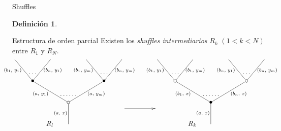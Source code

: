 \documentclass[12pt,aspectratio=169]{beamer}
\numberwithin{equation}{section}
\theoremstyle{definition}
\newtheorem{defi}[teo]{Definici\'on}
\begin{document}
{\begin{frame}{Shuffles}
\begin{defi}
    \end{defi}
\end{frame}

\begin{frame}{Estructura de orden parcial}
    Existen los \emph{shuffles intermediarios} $R_k$ $(1 < k < N)$ entre $R_1$ y $R_N$. %
    $$
        \xy
        <0.075cm, 0cm>:
        (0.0, 0.0)*{}="1"; %
        (0.0, 15.0)*\cir<2pt>{}="2"; %
        (-25.0, 30.0)*=0{\bullet}="3"; %
        (-37.5, 45.0)*{}="4"; %
        (-12.5, 45.0)*{}="5"; %
        (25.0, 30.0)*=0{\bullet}="6"; %
        (12.5, 45.0)*{}="7"; %
        (37.5, 45.0)*{}="8"; %
        "1";"2" **\dir{-};
        "2";"3" **\dir{-};
        "3";"4" **\dir{-};
        "3";"5" **\dir{-};
        "2";"6" **\dir{-};
        "6";"7" **\dir{-};
        "6";"8" **\dir{-};
        (-5.5, 7.5)*=0{\scriptstyle (a,\text{ }x)};
        (-19.5, 21)*=0{\scriptstyle (a,\text{ }y_1)};
        (-39, 37.5)*=0{\scriptstyle (b_1,\text{ }y_1)};
        (-11, 37.5)*=0{\scriptstyle (b_n,\text{ }y_1)};
        (19.5, 21)*=0{\scriptstyle (a,\text{ }y_m)};
        (10.5, 37.5)*=0{\scriptstyle (b_1,\text{ }y_m)};
        (39.5, 37.5)*=0{\scriptstyle (b_n,\text{ }y_m)};
        (-25,35)*{\dots};
        (25,35)*{\dots};
        (0,20)*{\dots\dots};
        (-13,0)*{R_l};
        \endxy
        \xy
        <0.08cm, 0cm>:
        (-10, 0.0)*{}="1";
        (10, 10.0)*{}="2";
        {\ar(-10, 10)*{};(10,10)*{}};
        \endxy
        \xy
        <0.075cm, 0cm>:
        (0.0, 0.0)*{}="1"; %
        (0.0, 15.0)*=0{\bullet}="2"; %
        (-25.0, 30.0)*\cir<2pt>{}="3"; %
        (-37.5, 45.0)*{}="4"; %
        (-12.5, 45.0)*{}="5"; %
        (25.0, 30.0)*\cir<2pt>{}="6"; %
        (12.5, 45.0)*{}="7"; %
        (37.5, 45.0)*{}="8"; %
        "1";"2" **\dir{-};
        "2";"3" **\dir{-};
        "3";"4" **\dir{-};
        "3";"5" **\dir{-};
        "2";"6" **\dir{-};
        "6";"7" **\dir{-};
        "6";"8" **\dir{-};
        (-5.5, 7.5)*=0{\scriptstyle (a,\text{ }x)};
        (-19.5, 21)*=0{\scriptstyle (b_1,\text{ }x)};
        (-39, 37.5)*=0{\scriptstyle (b_1,\text{ }y_1)};
        (-11, 37.5)*=0{\scriptstyle (b_1,\text{ }y_m)};
        (19.5, 21)*=0{\scriptstyle (b_n,\text{ }x)};
        (10.5, 37.5)*=0{\scriptstyle (b_n,\text{ }y_1)};
        (39.5, 37.5)*=0{\scriptstyle (b_n,\text{ }y_m)};
        (-25,35)*{\dots};
        (25,35)*{\dots};
        (0,20)*{\dots\dots};
        (-13,0)*{R_k};
        \endxy
    $$


\end{frame}}
\end{document}
